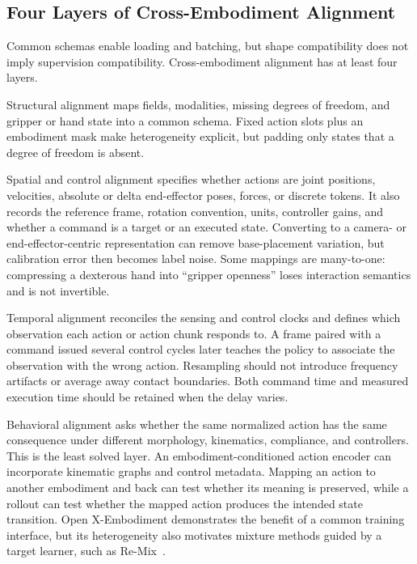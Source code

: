 \subsection{Four Layers of Cross-Embodiment Alignment}

Common schemas enable loading and batching, but shape compatibility does not imply supervision compatibility.
Cross-embodiment alignment has at least four layers.

Structural alignment maps fields, modalities, missing degrees of freedom, and gripper or hand state into a common schema.
Fixed action slots plus an embodiment mask make heterogeneity explicit, but padding only states that a degree of freedom is absent.

Spatial and control alignment specifies whether actions are joint positions, velocities, absolute or delta end-effector poses, forces, or discrete tokens.
It also records the reference frame, rotation convention, units, controller gains, and whether a command is a target or an executed state.
Converting to a camera- or end-effector-centric representation can remove base-placement variation, but calibration error then becomes label noise.
Some mappings are many-to-one: compressing a dexterous hand into ``gripper openness'' loses interaction semantics and is not invertible.

Temporal alignment reconciles the sensing and control clocks and defines which observation each action or action chunk responds to.
A frame paired with a command issued several control cycles later teaches the policy to associate the observation with the wrong action.
Resampling should not introduce frequency artifacts or average away contact boundaries.
Both command time and measured execution time should be retained when the delay varies.

Behavioral alignment asks whether the same normalized action has the same consequence under different morphology, kinematics, compliance, and controllers.
This is the least solved layer.
An embodiment-conditioned action encoder can incorporate kinematic graphs and control metadata.
Mapping an action to another embodiment and back can test whether its meaning is preserved, while a rollout can test whether the mapped action produces the intended state transition.
Open X-Embodiment demonstrates the benefit of a common training interface, but its heterogeneity also motivates mixture methods guided by a target learner, such as Re-Mix~\cite{collaboration2023open_2310_08864,hejna2024re_2408_14037}.

